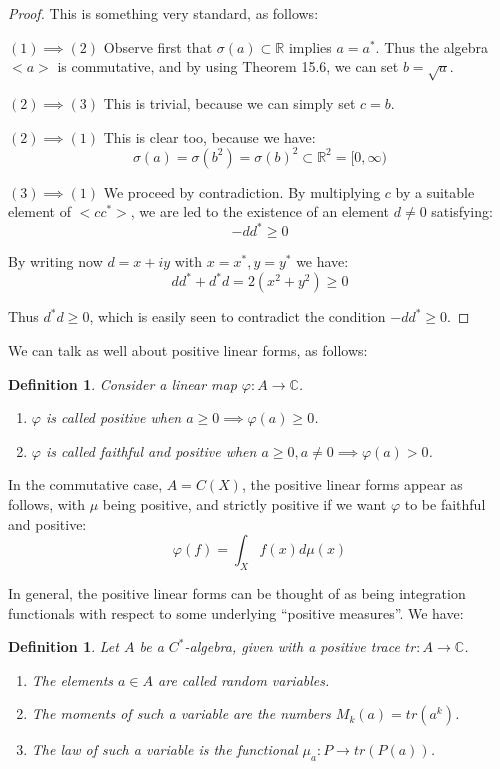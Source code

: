 \documentclass[12pt]{amsbook}
\newtheorem{definition}[theorem]{Definition}
\begin{document}
\begin{proof}
This is something very standard, as follows:

\medskip

$(1)\implies(2)$ Observe first that $\sigma(a)\subset\mathbb R$ implies $a=a^*$. Thus the algebra $<a>$ is commutative, and by using Theorem 15.6, we can set $b=\sqrt{a}$.

\medskip

$(2)\implies(3)$ This is trivial, because we can simply set $c=b$. 

\medskip

$(2)\implies(1)$ This is clear too, because we have:
$$\sigma(a)
=\sigma(b^2)
=\sigma(b)^2\subset\mathbb R^2
=[0,\infty)$$

$(3)\implies(1)$ We proceed by contradiction. By multiplying $c$ by a suitable element of $<cc^*>$, we are led to the existence of an element $d\neq0$ satisfying:
$$-dd^*\geq0$$

By writing now $d=x+iy$ with $x=x^*,y=y^*$ we have:
$$dd^*+d^*d
=2(x^2+y^2)
\geq0$$

Thus $d^*d\geq0$, which is easily seen to contradict the condition $-dd^*\geq0$.
\end{proof}

We can talk as well about positive linear forms, as follows:

\begin{definition}
Consider a linear map $\varphi:A\to\mathbb C$.
\begin{enumerate}
\item $\varphi$ is called positive when $a\geq0\implies\varphi(a)\geq0$.

\item $\varphi$ is called faithful and positive when $a\geq0,a\neq0\implies\varphi(a)>0$.
\end{enumerate}
\end{definition}

In the commutative case, $A=C(X)$, the positive linear forms appear as follows, with $\mu$ being positive, and strictly positive if we want $\varphi$ to be faithful and positive:
$$\varphi(f)=\int_Xf(x)d\mu(x)$$

In general, the positive linear forms can be thought of as being integration functionals with respect to some underlying ``positive measures''. We have:


\begin{definition}
Let $A$ be a $C^*$-algebra, given with a positive trace $tr:A\to\mathbb C$.
\begin{enumerate}
\item The elements $a\in A$ are called random variables.

\item The moments of such a variable are the numbers $M_k(a)=tr(a^k)$.

\item The law of such a variable is the functional $\mu_a:P\to tr(P(a))$.
\end{enumerate}
\end{definition}
\end{document}
